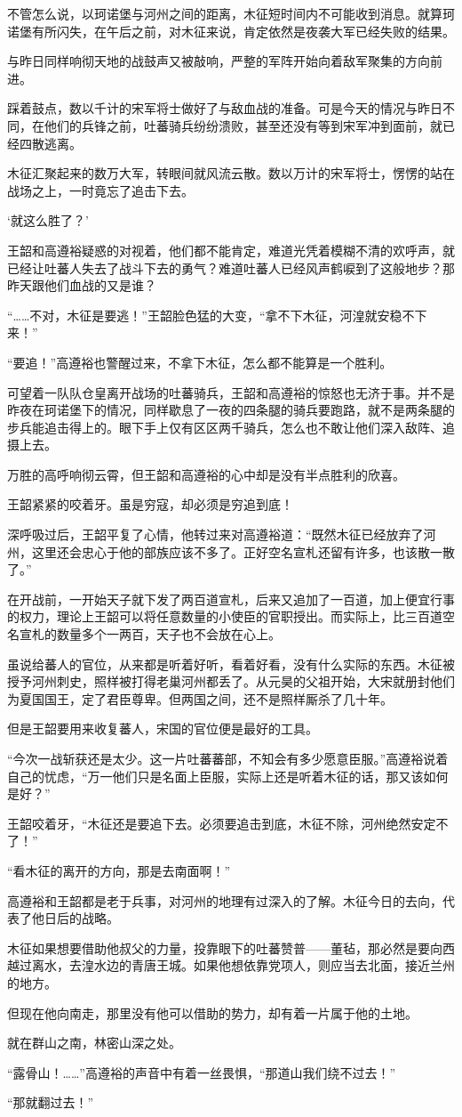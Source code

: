不管怎么说，以珂诺堡与河州之间的距离，木征短时间内不可能收到消息。就算珂诺堡有所闪失，在午后之前，对木征来说，肯定依然是夜袭大军已经失败的结果。

与昨日同样响彻天地的战鼓声又被敲响，严整的军阵开始向着敌军聚集的方向前进。

踩着鼓点，数以千计的宋军将士做好了与敌血战的准备。可是今天的情况与昨日不同，在他们的兵锋之前，吐蕃骑兵纷纷溃败，甚至还没有等到宋军冲到面前，就已经四散逃离。

木征汇聚起来的数万大军，转眼间就风流云散。数以万计的宋军将士，愣愣的站在战场之上，一时竟忘了追击下去。

‘就这么胜了？’

王韶和高遵裕疑惑的对视着，他们都不能肯定，难道光凭着模糊不清的欢呼声，就已经让吐蕃人失去了战斗下去的勇气？难道吐蕃人已经风声鹤唳到了这般地步？那昨天跟他们血战的又是谁？

“……不对，木征是要逃！”王韶脸色猛的大变，“拿不下木征，河湟就安稳不下来！”

“要追！”高遵裕也警醒过来，不拿下木征，怎么都不能算是一个胜利。

可望着一队队仓皇离开战场的吐蕃骑兵，王韶和高遵裕的惊怒也无济于事。并不是昨夜在珂诺堡下的情况，同样歇息了一夜的四条腿的骑兵要跑路，就不是两条腿的步兵能追击得上的。眼下手上仅有区区两千骑兵，怎么也不敢让他们深入敌阵、追摄上去。

万胜的高呼响彻云霄，但王韶和高遵裕的心中却是没有半点胜利的欣喜。

王韶紧紧的咬着牙。虽是穷寇，却必须是穷追到底！

深呼吸过后，王韶平复了心情，他转过来对高遵裕道：“既然木征已经放弃了河州，这里还会忠心于他的部族应该不多了。正好空名宣札还留有许多，也该散一散了。”

在开战前，一开始天子就下发了两百道宣札，后来又追加了一百道，加上便宜行事的权力，理论上王韶可以将任意数量的小使臣的官职授出。而实际上，比三百道空名宣札的数量多个一两百，天子也不会放在心上。

虽说给蕃人的官位，从来都是听着好听，看着好看，没有什么实际的东西。木征被授予河州刺史，照样被打得老巢河州都丢了。从元昊的父祖开始，大宋就册封他们为夏国国王，定了君臣尊卑。但两国之间，还不是照样厮杀了几十年。

但是王韶要用来收复蕃人，宋国的官位便是最好的工具。

“今次一战斩获还是太少。这一片吐蕃蕃部，不知会有多少愿意臣服。”高遵裕说着自己的忧虑，“万一他们只是名面上臣服，实际上还是听着木征的话，那又该如何是好？”

王韶咬着牙，“木征还是要追下去。必须要追击到底，木征不除，河州绝然安定不了！”

“看木征的离开的方向，那是去南面啊！”

高遵裕和王韶都是老于兵事，对河州的地理有过深入的了解。木征今日的去向，代表了他日后的战略。

木征如果想要借助他叔父的力量，投靠眼下的吐蕃赞普——董毡，那必然是要向西越过离水，去湟水边的青唐王城。如果他想依靠党项人，则应当去北面，接近兰州的地方。

但现在他向南走，那里没有他可以借助的势力，却有着一片属于他的土地。

就在群山之南，林密山深之处。

“露骨山！……”高遵裕的声音中有着一丝畏惧，“那道山我们绕不过去！”

“那就翻过去！”

